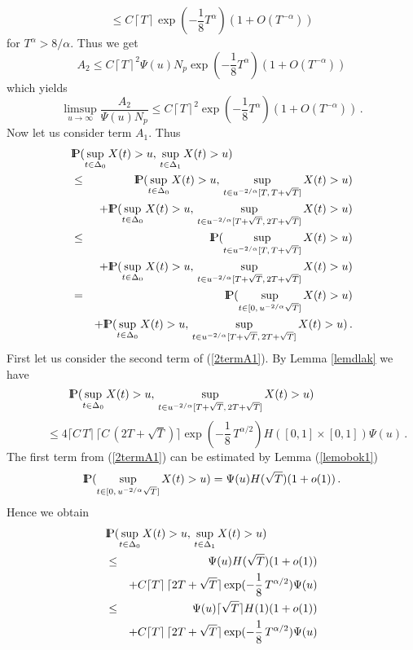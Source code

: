 $$
\leq C\left\lceil T\right\rceil\exp(-\frac{1}{8}T^\alpha)(1+O(T^{-\alpha}))
$$
for $T^\alpha>8/\alpha$.
Thus we get
$$
A_2\leq C\left\lceil T\right\rceil^2\Psi(u)N_p\exp(-\frac{1}{8}T^\alpha)(1+O(T^{-\alpha}))
$$
which yields
\begin{equation}\label{lima2}
\limsup_{u\rightarrow\infty}\frac{A_2}{\Psi(u)N_p}\leq C\left\lceil T\right\rceil^2 \exp(-\frac{1}{8}T^\alpha)(1+O(T^{-\alpha}))\,.
\end{equation}
Now let us consider term $A_1$. Thus
\begin{eqnarray}
\lefteqn{\Prob(\sup_{t\in \Delta_0} X(t)>u,\,\sup_{t\in \Delta_1} X(t)>u)}\nonumber\\
&\leq&
\Prob(\sup_{t\in \Delta_0} X(t)>u,\,\sup_{t\in u^{-2/\alpha}[T,\,T+\sqrt{T}]} X(t)>u)\nonumber\\
&&+\Prob(\sup_{t\in \Delta_0} X(t)>u,\,\sup_{t\in u^{-2/\alpha}[T+\sqrt{T},\,2T+\sqrt{T}]} X(t)>u)\nonumber\\
&\leq& \Prob(\sup_{t\in u^{-2/\alpha}[T,\,T+\sqrt{T}]} X(t)>u)\nonumber\\
&&+\Prob(\sup_{t\in \Delta_0} X(t)>u,\,\sup_{t\in u^{-2/\alpha}[T+\sqrt{T},\,2T+\sqrt{T}]} X(t)>u)\nonumber\\
&=&\Prob(\sup_{t\in [0,\,u^{-2/\alpha}\sqrt{T}]} X(t)>u)\nonumber\\
&&+\Prob(\sup_{t\in \Delta_0} X(t)>u,\,\sup_{t\in u^{-2/\alpha}[T+\sqrt{T},\,2T+\sqrt{T}]} X(t)>u)\,.\label{2termA1}
\end{eqnarray}
First let us consider the second term of (\ref{2termA1}). By Lemma \ref{lemdlak} we have
$$
{\rm I\hspace{-0.8mm}P}(\sup_{t\in \Delta_0} X(t)>u,\,\sup_{t\in u^{-2/\alpha}[T+\sqrt{T},\,2T+\sqrt{T}]} X(t)>u)
\,\,\,\,\,\,\,\,\,\,\,\,\,\,\,\,\,\,\,\,\,
$$
$$
\,\,\,\,\,\,\,\,\,\,\,\,\,\,\,\,
\leq 4\lceil C\,T \rceil
\,\lceil C\,(2T+\sqrt{T}) \rceil
\exp(-\frac{1}{8}\,T^{\alpha/2})H([0,1]\times [0,1])\Psi(u)\,.
$$
The first term from (\ref{2termA1}) can be estimated by Lemma (\ref{lemobok1})
$$
{\rm I\hspace{-0.8mm}P}(\sup_{t\in [0,\,u^{-2/\alpha}\sqrt{T}]} X(t)>u)=
\Psi(u)H(\sqrt{T})(1+o(1))\,.
$$
Hence we obtain
\begin{eqnarray}
\lefteqn{\Prob(\sup_{t\in \Delta_0} X(t)>u,\,\sup_{t\in \Delta_1} X(t)>u)}\nonumber\\
&\leq&
\Psi(u)H(\sqrt{T})(1+o(1))\nonumber\\
&&+C\lceil T \rceil
\,\lceil 2T+\sqrt{T} \rceil
\exp(-\frac{1}{8}\,T^{\alpha/2})\Psi(u)\nonumber\\
&\leq& 
\Psi(u)\lceil \sqrt{T}\rceil H(1)(1+o(1))\nonumber\\
&&+C\lceil T \rceil
\,\lceil 2T+\sqrt{T} \rceil
\exp(-\frac{1}{8}\,T^{\alpha/2})\Psi(u)\label{ogra1}
\end{eqnarray}
